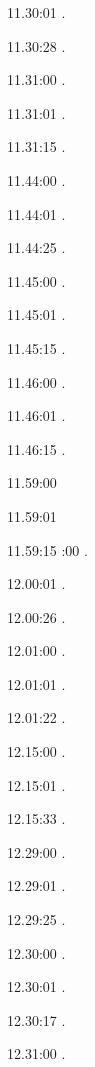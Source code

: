 \documentclass[italian]{article}
\begin{document}
11.30:01   .

11.30:28   .

11.31:00   .

11.31:01   .

11.31:15   .

11.44:00   .

11.44:01   .

11.44:25   .

11.45:00   .

11.45:01   .

11.45:15   .

11.46:00   .

11.46:01   .

11.46:15   .

11.59:00   

11.59:01   

11.59:15   
:00   .

12.00:01  .

12.00:26   .

12.01:00    . 

12.01:01    . 

12.01:22    . 

12.15:00   . 

12.15:01    . 

12.15:33    . 

12.29:00    . 

12.29:01    .

12.29:25    .

12.30:00    .

12.30:01    .

12.30:17    .

12.31:00    .
\end{document}
